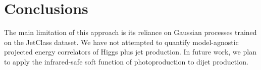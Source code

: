 \section{Conclusions}\label{sec:conclusions}

The main limitation of this approach is its reliance on Gaussian
processes trained on the JetClass dataset. We have not attempted to
quantify model-agnostic projected energy correlators of Higgs plus jet
production. In future work, we plan to apply the infrared-safe soft
function of photoproduction to dijet production.

